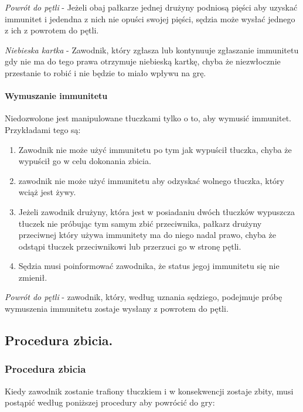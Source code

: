 \documentclass[12pt]{article}
\begin{document}
\emph{Powrót do pętli} - Jeżeli obaj pałkarze jednej drużyny podniosą
pięści aby uzyskać immunitet i jedendna z nich nie opuści swojej pięści,
sędzia może wysłać jednego z ich z powrotem do pętli.

\emph{Niebieska kartka} - Zawodnik, który zgłasza lub kontynuuje
zgłaszanie immunitetu gdy nie ma do tego prawa otrzymuje niebieską
kartkę, chyba że niezwłocznie przestanie to robić i nie będzie to miało
wpływu na grę.

\paragraph{Wymuszanie immunitetu}
Niedozwolone jest manipulowane
tłuczkami tylko o to, aby wymusić immunitet. Przykładami tego są:

\begin{enumerate}
	\item
	      Zawodnik nie może użyć immunitetu po tym jak wypuścił tłuczka, chyba
	      że wypuścił go w celu dokonania zbicia.
	\item
	      zawodnik nie może użyć immunitetu aby odzyskać wolnego tłuczka, który
	      wciąż jest żywy.
	\item
	      Jeżeli zawodnik drużyny, która jest w posiadaniu dwóch tłuczków
	      wypuszcza tłuczek nie próbując tym samym zbić przeciwnika, pałkarz
	      drużyny przeciwnej który używa immunitety ma do niego nadal prawo,
	      chyba że odstąpi tłuczek przeciwnikowi lub przerzuci go w stronę
	      pętli.
	\item
	      Sędzia musi poinformować zawodnika, że status jegoj immunitetu się nie
	      zmienił.
\end{enumerate}

\emph{Powrót do pętli} - zawodnik, który, według uznania sędziego,
podejmuje próbę wymuszenia immunitetu zostaje wysłany z powrotem do
pętli.

\subsection{Procedura zbicia.}

\subsubsection{Procedura zbicia}

Kiedy zawodnik zostanie trafiony tłuczkiem i w konsekwencji zostaje
zbity, musi postąpić według poniższej procedury aby powrócić do gry:
\end{document}
